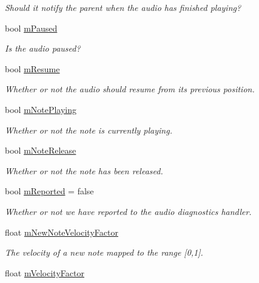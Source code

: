 \begin{DoxyCompactItemize}
\begin{DoxyCompactList}\small\item\em Should it notify the parent when the audio has finished playing? \end{DoxyCompactList}\item 
bool \hyperlink{group___n_o_o_priv_var_ga50fe6047e6a199215fc70b9fc78ac7eb}{m\+Paused}
\begin{DoxyCompactList}\small\item\em Is the audio paused? \end{DoxyCompactList}\item 
bool \hyperlink{group___n_o_o_priv_var_ga1f7a31f1aefc1633f1f435e3438a1efb}{m\+Resume}
\begin{DoxyCompactList}\small\item\em Whether or not the audio should resume from its previous position. \end{DoxyCompactList}\item 
bool \hyperlink{group___n_o_o_priv_var_ga4417170b8fa977f05a0b4cd0d16412fd}{m\+Note\+Playing}
\begin{DoxyCompactList}\small\item\em Whether or not the note is currently playing. \end{DoxyCompactList}\item 
bool \hyperlink{group___n_o_o_priv_var_ga88bfcc80d0cd20c81cd89d19d3231b84}{m\+Note\+Release}
\begin{DoxyCompactList}\small\item\em Whether or not the note has been released. \end{DoxyCompactList}\item 
bool \hyperlink{group___n_o_o_priv_var_gafa20525b5515ab62d109f44ab45fba21}{m\+Reported} = false
\begin{DoxyCompactList}\small\item\em Whether or not we have reported to the audio diagnostics handler. \end{DoxyCompactList}\item 
float \hyperlink{group___n_o_o_priv_var_gaf3cd650d21c56c25ce988d9f75279278}{m\+New\+Note\+Velocity\+Factor}
\begin{DoxyCompactList}\small\item\em The velocity of a new note mapped to the range \mbox{[}0,1\mbox{]}. \end{DoxyCompactList}\item 
float \hyperlink{group___n_o_o_priv_var_ga84df25e871d69746a7c520f3f8b49a27}{m\+Velocity\+Factor}

\end{DoxyCompactItemize}
